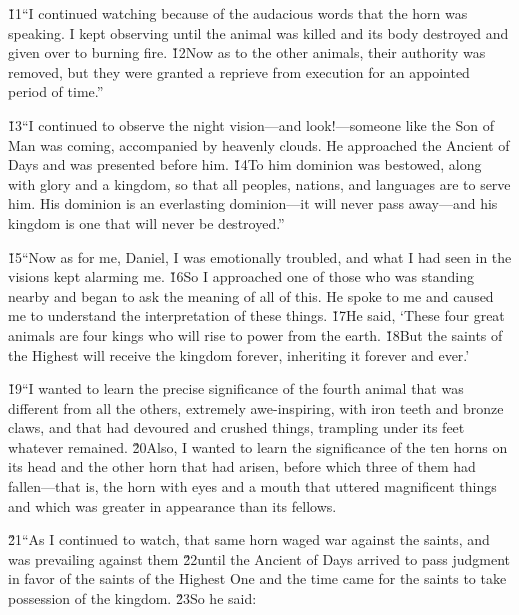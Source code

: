 \v{11}``I continued watching because of the audacious words that the horn was speaking. I kept observing until the animal was killed and its body destroyed and given over to burning fire. \v{12}Now as to the other animals, their authority was removed, but they were granted a reprieve from execution for an appointed period of time.''

\v{13}``I continued to observe the night vision---and look!---someone like the Son of Man was coming, accompanied by heavenly clouds. He approached the Ancient of Days and was presented before him. \v{14}To him dominion was bestowed, along with glory and a kingdom, so that all peoples, nations, and languages are to serve him. His dominion is an everlasting dominion---it will never pass away---and his kingdom is one that will never be destroyed.''

\v{15}``Now as for me, Daniel, I was emotionally troubled, and what I had seen in the visions kept alarming me. \v{16}So I approached one of those who was standing nearby and began to ask the meaning of all of this. He spoke to me and caused me to understand the interpretation of these things. \v{17}He said, `These four great animals are four kings who will rise to power from the earth. \v{18}But the saints of the Highest will receive the kingdom forever, inheriting it forever and ever.'

\v{19}``I wanted to learn the precise significance of the fourth animal that was different from all the others, extremely awe-inspiring, with iron teeth and bronze claws, and that had devoured and crushed things, trampling under its feet whatever remained. \v{20}Also, I wanted to learn the significance of the ten horns on its head and the other horn that had arisen, before which three of them had fallen---that is, the horn with eyes and a mouth that uttered magnificent things and which was greater in appearance than its fellows.

\v{21}``As I continued to watch, that same horn waged war against the saints, and was prevailing against them \v{22}until the Ancient of Days arrived to pass judgment in favor of the saints of the Highest One and the time came for the saints to take possession of the kingdom. \v{23}So he said:

